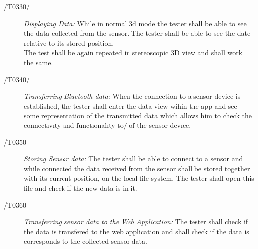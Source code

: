 \begin{description}
	\item[/T0330/]
	\textit{Displaying Data:} While in normal 3d mode the tester shall be able to see the data collected from the sensor. The tester shall be able to see
  the date relative to its stored position. \\
  The test shall be again repeated in stereoscopic 3D view and shall work the same.
\end{description}

\begin{description}
	\item[/T0340/]
	\textit{Transferring Bluetooth data:} When the connection to a sensor device is established, the tester shall enter the data view wihin the app and see some representation of the transmitted data which allows him to check the connectivity and functionality to/ of the sensor device.
\end{description}

\begin{description}
  \item[/T0350]
  \textit{Storing Sensor data:} The tester shall be able to connect to a sensor and while connected the data received from the sensor shall be stored together with its current position,
  on the local file system. The tester shall open this file and check if the new data is in it.
\end{description}

\begin{description}
  \item[/T0360]
  \textit{Transferring sensor data to the Web Application:} The tester shall check if the data is transfered to the web application and shall check
  if the data is corresponds to the collected sensor data.
\end{description}

